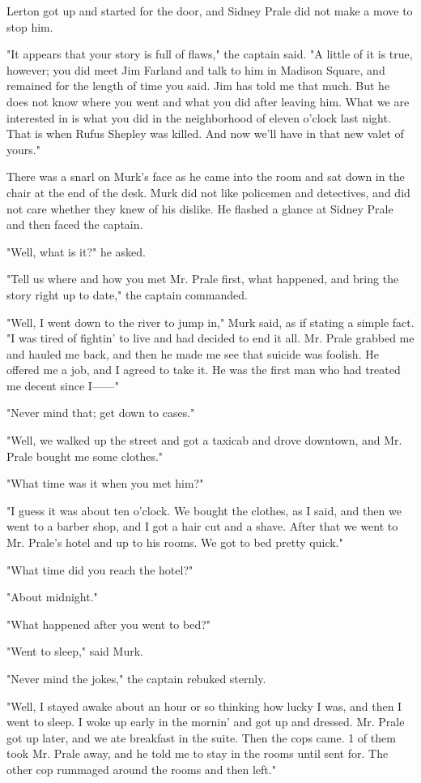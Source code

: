 \documentclass{novel}
\begin{document}
Lerton got up and started for the door, and Sidney Prale did not make a move to stop him.

"It appears that your story is full of flaws," the captain said. "A little of it is true, however; you did meet Jim Farland and talk to him in Madison Square, and remained for the length of time you said. Jim has told me that much. But he does not know where you went and what you did after leaving him. What we are interested in is what you did in the neighborhood of eleven o'clock last night. That is when Rufus Shepley was killed. And now we'll have in that new valet of yours."

There was a snarl on Murk's face as he came into the room and sat down in the chair at the end of the desk. Murk did not like policemen and detectives, and did not care whether they knew of his dislike. He flashed a glance at Sidney Prale and then faced the captain.

"Well, what is it?" he asked.

"Tell us where and how you met Mr. Prale first, what happened, and bring the story right up to date," the captain commanded.

"Well, I went down to the river to jump in," Murk said, as if stating a simple fact. "I was tired of fightin' to live and had decided to end it all. Mr. Prale grabbed me and hauled me back, and then he made me see that suicide was foolish. He offered me a job, and I agreed to take it. He was the first man who had treated me decent since I------"

"Never mind that; get down to cases."

"Well, we walked up the street and got a taxicab and drove downtown, and Mr. Prale bought me some clothes."

"What time was it when you met him?"

"I guess it was about ten o'clock. We bought the clothes, as I said, and then we went to a barber shop, and I got a hair cut and a shave. After that we went to Mr. Prale's hotel and up to his rooms. We got to bed pretty quick."

"What time did you reach the hotel?"

"About midnight."

"What happened after you went to bed?"

"Went to sleep," said Murk.

"Never mind the jokes," the captain rebuked sternly.

"Well, I stayed awake about an hour or so thinking how lucky I was, and then I went to sleep. I woke up early in the mornin' and got up and dressed. Mr. Prale got up later, and we ate breakfast in the suite. Then the cops came. 1 of them took Mr. Prale away, and he told me to stay in the rooms until sent for. The other cop rummaged around the rooms and then left."
\end{document}
